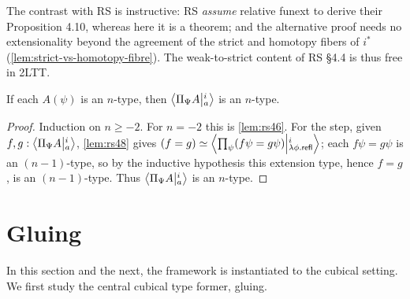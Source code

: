 \begin{longversion}
The contrast with RS is instructive: RS \emph{assume} relative funext to
derive their Proposition 4.10, whereas here it is a theorem; and the
alternative proof needs no extensionality beyond the agreement of the
strict and homotopy fibers of
$i^*$ (\cref{lem:strict-vs-homotopy-fibre}). The weak-to-strict content of RS
\S4.4 is thus free in 2LTT.
\end{longversion}

\begin{lemma}\label{lem:rs412}
	If each $A(\psi)$ is an $n$-type, then $\Ext{i}{\Pi_\Psi A}{a}$ is an $n$-type.
\end{lemma}
\begin{proof}
	Induction on $n\ge-2$. For $n=-2$ this is \cref{lem:rs46}. For the step, given
	$f,g:\Ext{i}{\Pi_\Psi A}{a}$, \cref{lem:rs48} gives
	$(f=g)\simeq\Ext{i}{\prod_{\psi}(f\psi=g\psi)}{\lambda\phi.\mathsf{refl}}$;
	each $f\psi=g\psi$ is an $(n-1)$-type, so by the inductive hypothesis this
	extension type, hence $f=g$, is an $(n-1)$-type. Thus $\Ext{i}{\Pi_\Psi A}{a}$ is
	an $n$-type.
\end{proof}


\section{Gluing}\label{sec:gluing}

In this section and the next, the framework is instantiated to the cubical
setting. We first study
the central cubical type former, gluing.

